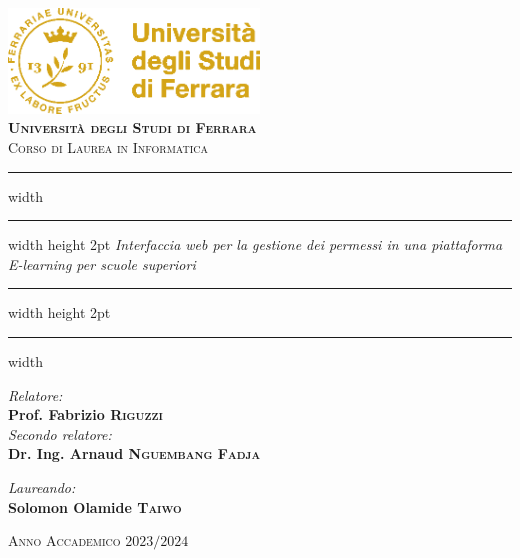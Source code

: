 \documentclass[a4paper, 12pt]{book}
\begin{document}

\begin{titlepage}
  \AddToShipoutPictureBG*{%
    \AtPageLowerLeft{%
      \color{CustomGreen}\rule{\paperwidth}{\paperheight}%
    }%
  }

  \color{Gold}  %
  \centering
  \vspace*{5mm}
  \includegraphics[width=0.5\textwidth]{../images/logo-unife-gold.png}\\
  \vspace*{1cm}
  \huge \textbf{\textsc{Università degli Studi di Ferrara}}\\
  \Large \textsc{Corso di Laurea in Informatica}

  \vspace*{2.5cm}
  \hrule width \hsize \kern 1mm \hrule width \hsize height 2pt
  \vspace*{10mm}
  \Huge \emph{\textnormal{Interfaccia web per la gestione dei permessi in una piattaforma E-learning per scuole superiori}}
  \vspace*{10mm}
  \hrule width \hsize height 2pt
  \vspace*{1mm}
  \hrule width \hsize \kern 1mm

  \vspace*{3.5cm}
  \begin{minipage}{0.45\textwidth}
    \begin{flushleft} \Large
      \emph{Relatore:}\\
      \Large \textbf{Prof. Fabrizio \textsc{Riguzzi}}\\
      \emph{Secondo relatore:}\\
      \Large \textbf{Dr. Ing. Arnaud \textsc{Nguembang Fadja}}
    \end{flushleft}
  \end{minipage}
  \begin{minipage}{0.5\textwidth}
    \begin{flushright} \Large
      \emph{Laureando:} \\
      \Large \textbf{Solomon Olamide \textsc{Taiwo}}
    \end{flushright}
  \end{minipage}

  \vfill %
  \Large \textsc{Anno Accademico $2023/2024$}
\end{titlepage}

\restoregeometry
\end{document}

